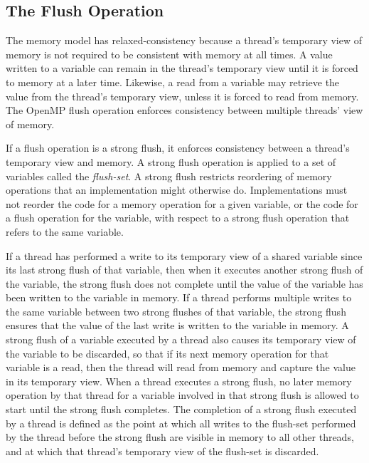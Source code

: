 \subsection{The Flush Operation}
\label{subsec:The Flush Operation}


The memory model has relaxed-consistency because a thread's temporary view of
memory is not required to be consistent with memory at all times. A value
written to a variable can remain in the thread's temporary view until it is
forced to memory at a later time. Likewise, a read from a variable may
retrieve the value from the thread's temporary view, unless it is forced to
read from memory. The OpenMP flush operation enforces consistency between
multiple threads' view of memory.

If a flush operation is a strong flush, it enforces consistency between a
thread's temporary view and memory.  A strong flush operation is applied to a
set of variables called the \emph{flush-set}. A strong flush restricts
reordering of memory operations that an implementation might otherwise do.
Implementations must not reorder the code for a memory operation for a given
variable, or the code for a flush operation for the variable, with respect to
a strong flush operation that refers to the same variable.

If a thread has performed a write to its temporary view of a shared variable
since its last strong flush of that variable, then when it executes another
strong flush of the variable, the strong flush does not complete until the
value of the variable has been written to the variable in memory. If a thread
performs multiple writes to the same variable between two strong flushes of
that variable, the strong flush ensures that the value of the last write is
written to the variable in memory. A strong flush of a variable executed by a
thread also causes its temporary view of the variable to be discarded, so that
if its next memory operation for that variable is a read, then the thread will
read from memory and capture the value in its temporary view.
When a thread executes a strong flush, no later memory operation by that
thread for a variable involved in that strong flush is allowed to start until
the strong flush completes.  The completion of a strong flush 
executed by a thread is defined as the point at which all writes to
the flush-set performed by the thread before the strong flush are visible in 
memory to all other threads, and at which that thread's temporary view of the flush-set
is discarded.

